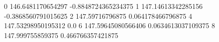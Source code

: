 0 146.6481170654297 -0.8848724365234375
1 147.14613342285156 -0.3868560791015625
2 147.59716796875 0.064178466796875
4 147.53298950195312 0.0
6 147.59645080566406 0.0634613037109375
8 147.999755859375 0.466766357421875
